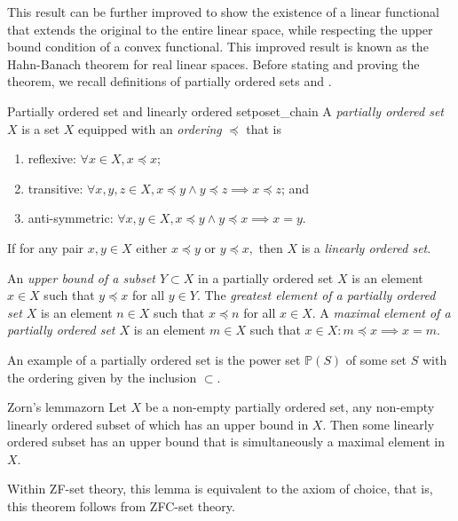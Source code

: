 This result can be further improved to show the existence of a linear functional that extends the original to the entire linear space, while respecting the upper bound condition of a convex functional. This improved result is known as the Hahn-Banach theorem for real linear spaces. Before stating and proving the theorem, we recall definitions of partially ordered sets and .
\begin{definition}{Partially ordered set and linearly ordered set}{poset_chain}
    A \emph{partially ordered set} \(X\) is a set \(X\) equipped with an \emph{ordering} \(\preceq\) that is
    \begin{enumerate}[label=(\alph*)]
        \item reflexive: \(\forall x \in X, x \preceq x\);
        \item transitive: \(\forall x,y,z \in X, x \preceq y \land y \preceq z \implies x \preceq z\); and
        \item anti-symmetric: \(\forall x, y\in X, x \preceq y \land y \preceq x \implies x = y\).
    \end{enumerate}
    If for any pair \(x, y \in X\) either \(x \preceq y\) or \(y \preceq x,\) then \(X\) is a \emph{linearly ordered set}.

    An \emph{upper bound of a subset \(Y \subset X\)} in a partially ordered set \(X\) is an element \(x \in X\) such that \(y \preceq x\) for all \(y \in Y.\) The \emph{greatest element of a partially ordered set \(X\)} is an element \(n \in X\) such that \(x \preceq n\) for all \(x \in X\). A \emph{maximal element of a partially ordered set \(X\)} is an element \(m \in X\) such that \(x \in X : m \preceq x \implies x = m\).
\end{definition}
\begin{remark}%
    An example of a partially ordered set is the power set \(\mathbb{P}(S)\) of some set \(S\) with the ordering given by the inclusion \(\subset\).
\end{remark}

\begin{theorem}{Zorn's lemma}{zorn}
    Let \(X\) be a non-empty partially ordered set, any non-empty linearly ordered subset of which has an upper bound in \(X\). Then some linearly ordered subset has an upper bound that is simultaneously a maximal element in \(X\).
\end{theorem}
\begin{remark}
    Within ZF-set theory, this lemma is equivalent to the axiom of choice, that is, this theorem follows from ZFC-set theory.
\end{remark}

